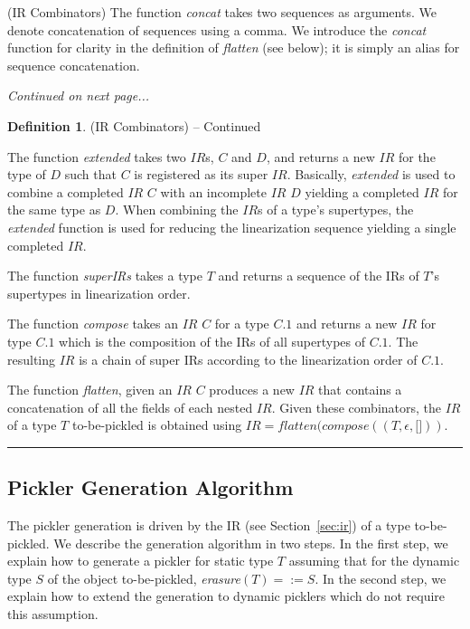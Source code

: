 \documentclass[preprint,10pt]{sigplanconf}
\theoremstyle{definition}
\theoremstyle{definition}
\newtheorem*{defn*}{Definition}
\begin{document}
\begin{defn}{(IR Combinators)}
The function \textit{concat} takes two sequences as arguments. We
denote concatenation of sequences using a comma. We introduce the
\textit{concat} function for clarity in the definition of \textit{flatten}
(see below); it is simply an alias for sequence concatenation.

\vspace{0.4cm}

\textit{Continued on next page...}

\vspace{0.6cm}

\end{defn}


\begin{defn*}{(IR Combinators) -- Continued}

The function \textit{extended} takes two $IR$s, $C$ and $D$, and returns a new
$IR$ for the type of $D$ such that $C$ is registered as its super $IR$.
Basically, \textit{extended} is used to combine a completed $IR$ $C$ with an
incomplete $IR$ $D$ yielding a completed $IR$ for the same type as $D$. When
combining the $IR$s of a type's supertypes, the \textit{extended} function is
used for reducing the linearization sequence yielding a single completed $IR$.

The function \textit{superIRs} takes a type $T$ and returns a sequence of the
IRs of $T$'s supertypes in linearization order.

The function \textit{compose} takes an $IR$ $C$ for a type $C.1$ and returns a
new $IR$ for type $C.1$ which is the composition of the IRs of all supertypes
of $C.1$. The resulting $IR$ is a chain of super IRs according to the
linearization order of $C.1$.

The function \textit{flatten}, given an $IR$ $C$ produces a new $IR$ that
contains a concatenation of all the fields of each nested $IR$. Given
these combinators, the $IR$ of a type $T$ to-be-pickled is obtained
using $IR = flatten(compose((T, \epsilon, \lbrack \rbrack))$.
\end{defn*}

\rule{0.9\columnwidth}{0.7pt}

\subsection{Pickler Generation Algorithm}

The pickler generation is driven by the IR (see Section~\ref{sec:ir}) of a
type to-be-pickled. We describe the generation algorithm in two steps. In the
first step, we explain how to generate a pickler for static type $T$ assuming
that for the dynamic type $S$ of the object to-be-pickled,
\textit{erasure}$(T) =:= S$. In the second step, we explain how to extend the
generation to dynamic picklers which do not require this assumption.
\end{document}
